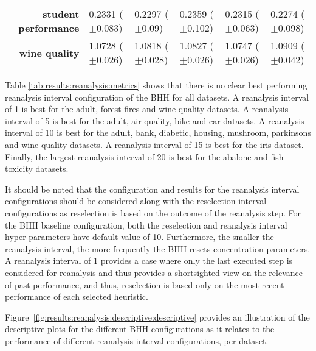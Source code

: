 \begin{table}[htb]
{\begin{tabular}{r|lllll}
			\textbf{student performance} & \cellcolor[rgb]{ .992,  .741,  .486}0.2331 ($\pm$0.083)     & \cellcolor[rgb]{ .725,  .839,  .498}0.2297 ($\pm$0.09)  & \cellcolor[rgb]{ .973,  .412,  .42}0.2359 ($\pm$0.102)  & \cellcolor[rgb]{ 1,  .922,  .518}0.2315 ($\pm$0.063)   & \cellcolor[rgb]{ .388,  .745,  .482}0.2274 ($\pm$0.098) \\
			\textbf{wine quality}        & \cellcolor[rgb]{ .388,  .745,  .482}1.0728 ($\pm$0.026)     & \cellcolor[rgb]{ 1,  .922,  .518}1.0818 ($\pm$0.028)    & \cellcolor[rgb]{ 1,  .871,  .51}1.0827 ($\pm$0.026)     & \cellcolor[rgb]{ .514,  .78,  .486}1.0747 ($\pm$0.026) & \cellcolor[rgb]{ .973,  .412,  .42}1.0909 ($\pm$0.042)  \\
		\end{tabular}%


	}

\end{table}%

Table \ref{tab:results:reanalysis:metrics} shows that there is no clear best performing reanalysis interval configuration of the \acs{BHH} for all datasets. A reanalysis interval of 1 is best for the adult, forest fires and wine quality datasets. A reanalysis interval of 5 is best for the adult, air quality, bike and car datasets. A reanalysis interval of 10 is best for the adult, bank, diabetic, housing, mushroom, parkinsons and wine quality datasets. A reanalysis interval of 15 is best for the iris dataset. Finally, the largest reanalysis interval of 20 is best for the abalone and fish toxicity datasets.

It should be noted that the configuration and results for the reanalysis interval configurations should be considered along with the reselection interval configurations as reselection is based on the outcome of the reanalysis step. For the \acs{BHH} baseline configuration, both the reselection and reanalysis interval hyper-parameters have default value of 10. Furthermore, the smaller the reanalysis interval, the more frequently the \acs{BHH} resets concentration parameters. A reanalysis interval of 1 provides a case where only the last executed step is considered for reanalysis and thus provides a shortsighted view on the relevance of past performance, and thus, reselection is based only on the most recent performance of each selected heuristic.

Figure~\ref{fig:results:reanalysis:descriptive:descriptive} provides an illustration of the descriptive plots for the different \acs{BHH} configurations as it relates to the performance of different reanalysis interval configurations, per dataset.

